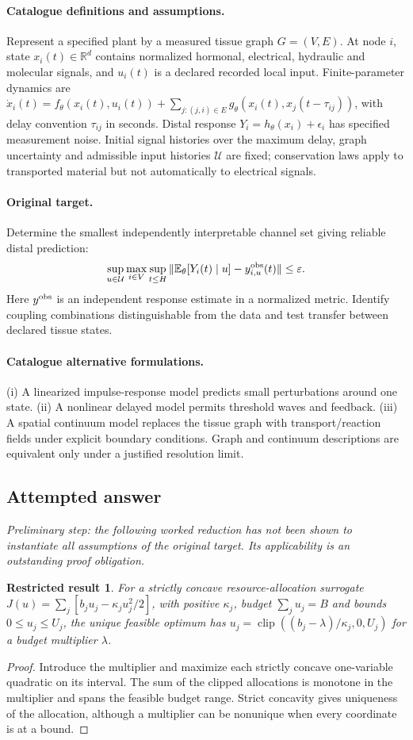 \documentclass[11pt]{article}
\newcommand{\R}{\mathbb R}
\newcommand{\E}{\mathbb E}
\providecommand{\R}{\mathbb R}
\providecommand{\E}{\mathbb E}
\newtheorem{attemptresult}{Restricted result}[section]
\begin{document}
\paragraph{Catalogue definitions and assumptions.}
Represent a specified plant by a measured tissue graph $G=(V,E)$. At node $i$, state $x_i(t)\in\R^d$ contains normalized hormonal, electrical, hydraulic and molecular signals, and $u_i(t)$ is a declared recorded local input. Finite-parameter dynamics are $\dot x_i(t)=f_\theta(x_i(t),u_i(t))+\sum_{j:(j,i)\in E}g_\theta(x_i(t),x_j(t-\tau_{ij}))$, with delay convention $\tau_{ij}$ in seconds. Distal response $Y_i=h_\theta(x_i)+\epsilon_i$ has specified measurement noise. Initial signal histories over the maximum delay, graph uncertainty and admissible input histories $\mathcal U$ are fixed; conservation laws apply to transported material but not automatically to electrical signals.
\paragraph{Original target.}
Determine the smallest independently interpretable channel set giving reliable distal prediction:
    \[\sup_{u\in\mathcal U}\max_{i\in V}
    \sup_{t\leq H}\|\E_\theta[Y_i(t)\mid u]-y^{\rm obs}_{i,u}(t)\|\leq\varepsilon.\]
    Here $y^{\rm obs}$ is an independent response estimate in a normalized metric. Identify coupling combinations distinguishable from the data and test transfer between declared tissue states.
\paragraph{Catalogue alternative formulations.}
(i) A linearized impulse-response model predicts small perturbations around one state. (ii) A nonlinear delayed model permits threshold waves and feedback. (iii) A spatial continuum model replaces the tissue graph with transport/reaction fields under explicit boundary conditions. Graph and continuum descriptions are equivalent only under a justified resolution limit.
\subsection{Attempted answer}
\noindent\emph{Preliminary step: the following worked reduction has not been shown to instantiate all assumptions of the original target. Its applicability is an outstanding proof obligation.}

\begin{attemptresult}
For a strictly concave resource-allocation surrogate $J(u)=\sum_j[b_ju_j-\kappa_j u_j^2/2]$, with positive $\kappa_j$, budget $\sum_ju_j=B$ and bounds $0\leq u_j\leq U_j$, the unique feasible optimum has $u_j=\operatorname{clip}((b_j-\lambda)/\kappa_j,0,U_j)$ for a budget multiplier $\lambda$.
\end{attemptresult}
\begin{proof}
Introduce the multiplier and maximize each strictly concave one-variable quadratic on its interval. The sum of the clipped allocations is monotone in the multiplier and spans the feasible budget range. Strict concavity gives uniqueness of the allocation, although a multiplier can be nonunique when every coordinate is at a bound.
\end{proof}
\end{document}
